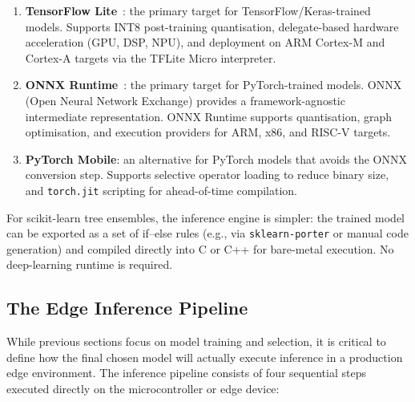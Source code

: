 \begin{enumerate}
  \item \textbf{TensorFlow Lite}~\cite{tensorflow_lite}: the primary
        target for TensorFlow/Keras-trained models.  Supports INT8
        post-training quantisation, delegate-based hardware
        acceleration (GPU, DSP, NPU), and deployment on ARM Cortex-M
        and Cortex-A targets via the TFLite Micro interpreter.
  \item \textbf{ONNX Runtime}~\cite{onnx_runtime}: the primary target
        for PyTorch-trained models.  ONNX (Open Neural Network
        Exchange) provides a framework-agnostic intermediate
        representation.  ONNX Runtime supports quantisation,
        graph optimisation, and execution providers for ARM, x86,
        and RISC-V targets.
  \item \textbf{PyTorch Mobile}: an alternative for PyTorch models
        that avoids the ONNX conversion step.  Supports selective
        operator loading to reduce binary size, and \texttt{torch.jit}
        scripting for ahead-of-time compilation.
\end{enumerate}

For scikit-learn tree ensembles, the inference engine is simpler: the
trained model can be exported as a set of if--else rules (e.g., via
\texttt{sklearn-porter} or manual code generation) and compiled
directly into C or C++ for bare-metal execution.  No deep-learning
runtime is required.


\subsection{The Edge Inference Pipeline}
\label{subsec:inference_pipeline}

While previous sections focus on model training and selection, it is critical to define how the final chosen model will actually execute inference in a production edge environment. The inference pipeline consists of four sequential steps executed directly on the microcontroller or edge device:

